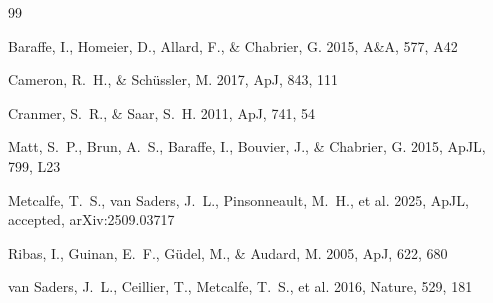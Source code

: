 \documentclass[11pt]{article}
\begin{document}
\begin{thebibliography}{99}

  Baraffe, I., Homeier, D., Allard, F., \& Chabrier, G. 2015, A\&A, 577, A42

  Cameron, R.~H., \& Sch\"ussler, M. 2017, ApJ, 843, 111

  Cranmer, S.~R., \& Saar, S.~H. 2011, ApJ, 741, 54

  Matt, S.~P., Brun, A.~S., Baraffe, I., Bouvier, J., \& Chabrier, G. 2015,
  ApJL, 799, L23

  Metcalfe, T.~S., van Saders, J.~L., Pinsonneault, M.~H., et al. 2025, ApJL,
  accepted, arXiv:2509.03717

  Ribas, I., Guinan, E.~F., G\"udel, M., \& Audard, M. 2005, ApJ, 622, 680

  van Saders, J.~L., Ceillier, T., Metcalfe, T.~S., et al. 2016, Nature, 529,
  181

\end{thebibliography}
\end{document}
